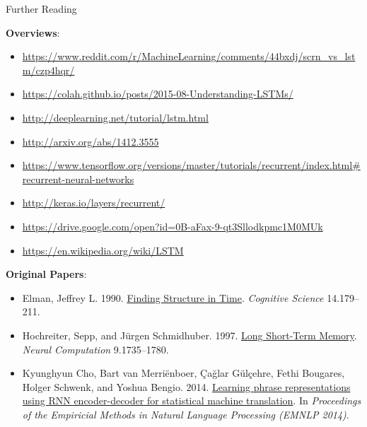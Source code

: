 \documentclass[xcolor=pdftex,x11names,table,hyperref]{beamer}
\begin{document}
\begin{frame}{Further Reading}

\textbf{Overviews}: \\[0.5em]
\begin{minipage}{1.1\textwidth}
\begin{tiny}
\begin{itemize}
	\item \url{https://www.reddit.com/r/MachineLearning/comments/44bxdj/scrn\_vs\_lstm/czp4hqr/}
	\item \url{https://colah.github.io/posts/2015-08-Understanding-LSTMs/}
	\item \url{http://deeplearning.net/tutorial/lstm.html}
	\item \url{http://arxiv.org/abs/1412.3555}
	\item \url{https://www.tensorflow.org/versions/master/tutorials/recurrent/index.html\#recurrent-neural-networks}
	\item \url{http://keras.io/layers/recurrent/}
	\item \url{https://drive.google.com/open?id=0B-aFax-9-qt3Sllodkpmc1M0MUk}
	\item \url{https://en.wikipedia.org/wiki/LSTM}
\end{itemize}
\end{tiny}
\end{minipage}

\vspace{1.0em}
\textbf{Original Papers}:
\begin{tiny}
\begin{itemize}
	\item Elman, Jeffrey L. 1990. \href{http://citeseerx.ist.psu.edu/viewdoc/summary?doi=10.1.1.28.9476}{Finding Structure in Time}. \textit{Cognitive Science} 14.179--211.
	\item Hochreiter, Sepp, and J\"{u}rgen Schmidhuber. 1997. \href{http://deeplearning.cs.cmu.edu/pdfs/Hochreiter97_lstm.pdf}{Long Short-Term Memory}. \textit{Neural Computation} 9.1735--1780.
	\item Kyunghyun Cho, Bart van Merri\"{e}nboer, \c{C}a\u{g}lar G\"{u}l\c{c}ehre, Fethi Bougares, Holger Schwenk, and Yoshua Bengio. 2014. \href{https://arxiv.org/abs/1406.1078}{Learning phrase representations using RNN encoder-decoder for statistical machine translation}. In \textit{Proceedings of the Empiricial Methods in Natural Language Processing (EMNLP 2014)}.
\end{itemize}
\end{tiny}
\end{frame}


\end{document}
